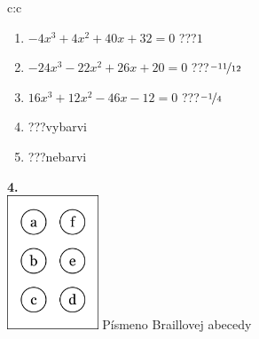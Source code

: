 \documentclass[10pt]{report}
\begin{document}
\begin{tabular}{c:c}
\begin{minipage}[c][104.5mm][t]{0.5\linewidth}
\begin{center}
\begin{minipage}{0.79\linewidth}
\begin{center}
\begin{varwidth}{\linewidth}
\begin{enumerate}
\item $-4x^3+4x^2+40x+32=0$\quad \dotfill\; ???\;\dotfill \quad $1$
\item $-24x^3-22x^2+26x+20=0$\quad \dotfill\; ???\;\dotfill \quad $\nicefrac{-11}{12}$
\item $16x^3+12x^2-46x-12=0$\quad \dotfill\; ???\;\dotfill \quad $\nicefrac{-1}{4}$
\item \quad \dotfill\; ???\;\dotfill \quad vybarvi
\item \quad \dotfill\; ???\;\dotfill \quad nebarvi
\end{enumerate}
\end{varwidth}
\end{center}
\end{minipage}
\begin{minipage}{0.20\linewidth}
\begin{center}
{\Huge\bfseries 4.} \\[2mm]
\includegraphics[height=40mm]{../images/braille.png}
{\small Písmeno Braillovej abecedy}
\end{center}
\end{minipage}
\end{center}
\end{minipage}
%
\end{tabular}
\newpage
\thispagestyle{empty}
\end{document}
